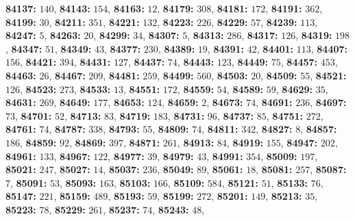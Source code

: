 \textsf{\bfseries 84137:} $140$, \textsf{\bfseries 84143:} $154$, \textsf{\bfseries 84163:} $12$, \textsf{\bfseries 84179:} $308$, \textsf{\bfseries 84181:} $172$, \textsf{\bfseries 84191:} $362$, \textsf{\bfseries 84199:} $30$, \textsf{\bfseries 84211:} $351$, \textsf{\bfseries 84221:} $132$, \textsf{\bfseries 84223:} $226$, \textsf{\bfseries 84229:} $57$, \textsf{\bfseries 84239:} $113$, \textsf{\bfseries 84247:} $5$, \textsf{\bfseries 84263:} $20$, \textsf{\bfseries 84299:} $34$, \textsf{\bfseries 84307:} $5$, \textsf{\bfseries 84313:} $286$, \textsf{\bfseries 84317:} $126$, \textsf{\bfseries 84319:} $198$, \textsf{\bfseries 84347:} $51$, \textsf{\bfseries 84349:} $43$, \textsf{\bfseries 84377:} $230$, \textsf{\bfseries 84389:} $19$, \textsf{\bfseries 84391:} $42$, \textsf{\bfseries 84401:} $113$, \textsf{\bfseries 84407:} $156$, \textsf{\bfseries 84421:} $394$, \textsf{\bfseries 84431:} $127$, \textsf{\bfseries 84437:} $74$, \textsf{\bfseries 84443:} $123$, \textsf{\bfseries 84449:} $75$, \textsf{\bfseries 84457:} $453$, \textsf{\bfseries 84463:} $26$, \textsf{\bfseries 84467:} $209$, \textsf{\bfseries 84481:} $259$, \textsf{\bfseries 84499:} $560$, \textsf{\bfseries 84503:} $20$, \textsf{\bfseries 84509:} $55$, \textsf{\bfseries 84521:} $126$, \textsf{\bfseries 84523:} $273$, \textsf{\bfseries 84533:} $13$, \textsf{\bfseries 84551:} $172$, \textsf{\bfseries 84559:} $54$, \textsf{\bfseries 84589:} $59$, \textsf{\bfseries 84629:} $35$, \textsf{\bfseries 84631:} $269$, \textsf{\bfseries 84649:} $177$, \textsf{\bfseries 84653:} $124$, \textsf{\bfseries 84659:} $2$, \textsf{\bfseries 84673:} $74$, \textsf{\bfseries 84691:} $236$, \textsf{\bfseries 84697:} $73$, \textsf{\bfseries 84701:} $52$, \textsf{\bfseries 84713:} $83$, \textsf{\bfseries 84719:} $183$, \textsf{\bfseries 84731:} $96$, \textsf{\bfseries 84737:} $85$, \textsf{\bfseries 84751:} $272$, \textsf{\bfseries 84761:} $74$, \textsf{\bfseries 84787:} $338$, \textsf{\bfseries 84793:} $55$, \textsf{\bfseries 84809:} $74$, \textsf{\bfseries 84811:} $342$, \textsf{\bfseries 84827:} $8$, \textsf{\bfseries 84857:} $186$, \textsf{\bfseries 84859:} $92$, \textsf{\bfseries 84869:} $397$, \textsf{\bfseries 84871:} $261$, \textsf{\bfseries 84913:} $84$, \textsf{\bfseries 84919:} $155$, \textsf{\bfseries 84947:} $202$, \textsf{\bfseries 84961:} $133$, \textsf{\bfseries 84967:} $122$, \textsf{\bfseries 84977:} $39$, \textsf{\bfseries 84979:} $43$, \textsf{\bfseries 84991:} $354$, \textsf{\bfseries 85009:} $197$, \textsf{\bfseries 85021:} $247$, \textsf{\bfseries 85027:} $14$, \textsf{\bfseries 85037:} $236$, \textsf{\bfseries 85049:} $89$, \textsf{\bfseries 85061:} $18$, \textsf{\bfseries 85081:} $257$, \textsf{\bfseries 85087:} $7$, \textsf{\bfseries 85091:} $53$, \textsf{\bfseries 85093:} $163$, \textsf{\bfseries 85103:} $166$, \textsf{\bfseries 85109:} $584$, \textsf{\bfseries 85121:} $51$, \textsf{\bfseries 85133:} $76$, \textsf{\bfseries 85147:} $221$, \textsf{\bfseries 85159:} $489$, \textsf{\bfseries 85193:} $59$, \textsf{\bfseries 85199:} $272$, \textsf{\bfseries 85201:} $149$, \textsf{\bfseries 85213:} $35$, \textsf{\bfseries 85223:} $78$, \textsf{\bfseries 85229:} $261$, \textsf{\bfseries 85237:} $74$, \textsf{\bfseries 85243:} $48$, 
